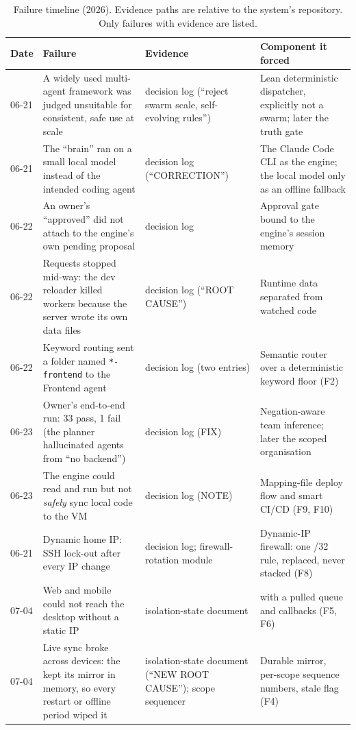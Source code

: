 \begin{table}[t]
\caption{Failure timeline (2026). Evidence paths are relative to the system's repository. Only failures with evidence are listed.}\label{tab:timeline}
\centering\scriptsize
\renewcommand{\arraystretch}{1.12}
\begin{tabular}{@{}p{0.6cm}p{5.6cm}p{4.6cm}p{5.6cm}@{}}
\toprule
Date & Failure & Evidence & Component it forced \\
\midrule
06-21 & A widely used multi-agent framework was judged unsuitable for consistent, safe use at scale & decision log (``reject swarm scale, self-evolving rules'') & Lean deterministic dispatcher, explicitly not a swarm; later the truth gate \\
06-21 & The ``brain'' ran on a small local model instead of the intended coding agent & decision log (``CORRECTION'') & The Claude Code CLI as the engine; the local model only as an offline fallback \\
06-22 & An owner's ``approved'' did not attach to the engine's own pending proposal & decision log & Approval gate bound to the engine's session memory \\
06-22 & Requests stopped mid-way: the dev reloader killed workers because the server wrote its own data files & decision log (``ROOT CAUSE'') & Runtime data separated from watched code \\
06-22 & Keyword routing sent a folder named \texttt{*-frontend} to the Frontend agent & decision log (two entries) & Semantic router over a deterministic keyword floor (F2) \\
06-23 & Owner's end-to-end run: 33 pass, 1 fail (the planner hallucinated agents from ``no backend'') & decision log (FIX) & Negation-aware team inference; later the scoped organisation \\
06-23 & The engine could read and run but not \emph{safely} sync local code to the VM & decision log (NOTE) & Mapping-file deploy flow and smart CI/CD (F9, F10) \\
06-21 & Dynamic home IP: SSH lock-out after every IP change & decision log; firewall-rotation module & Dynamic-IP firewall: one /32 rule, replaced, never stacked (F8) \\
07-04 & Web and mobile could not reach the desktop without a static IP & isolation-state document & \hub{} with a pulled queue and callbacks (F5, F6) \\
07-04 & Live sync broke across devices: the \hub{} kept its mirror in memory, so every restart or offline period wiped it & isolation-state document (``NEW ROOT CAUSE''); scope sequencer & Durable mirror, per-scope sequence numbers, stale flag (F4) \\

\end{tabular}
\end{table}
